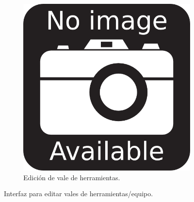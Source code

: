 \begin{figure}[h]
\centering
\begin{subfigure}{0.4\textwidth}
    \includegraphics[width=\textwidth]{imgs/no-image.png}
    \caption{Edición de vale de herramientas.}
    \label{fig:operaciones5}
\end{subfigure}
\caption{Interfaz para editar vales de herramientas/equipo.}
\end{figure}